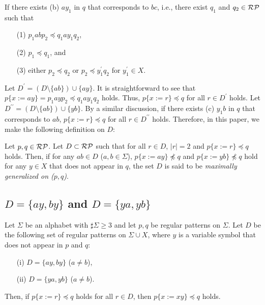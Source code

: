 \noindent
If there exists (b) $ay_{1}$ in $q$ that corresponds to $bc$, i.e., there exist $q_{1}$ and $q_{2}\in \mathcal{RP}$ such that
  \begin{enumerate}
  \item[(1)] $p_{1}abp_{2} \preceq q_{1}ay_{1}q_{2}$, 
  \item[(2)] $p_{1} \preceq q_{1}$, and
  \item[(3)] either $p_{2} \preceq q_{2}$ or $p_{2} \preceq y_{1}^{\prime}q_{2}$ for $y_{1}^{\prime}\in X$.
  \end{enumerate}
Let $D^{\prime} = (D \setminus \{ab\}) \cup \{ay\}$.
It is straightforward to see that $p\{x:=ay\} = p_{1}ayp_{2} \preceq q_{1}ay_{1}q_{2}$ holds.
Thus, $p \{ x := r \} \preceq q$ for all $r \in D^{\prime}$ holds.
Let $D^{\prime\prime} = (D \setminus \{ab\}) \cup \{yb\}$.
By a similar discussion, if there exists (c) $y_{1}b$ in $q$ that corresponds to $ab$, $p \{ x := r \} \preceq q$ for all $r \in D^{\prime\prime}$ holds.
Therefore, in this paper, we make the following definition on $D$:

\smallskip

\begin{dfn}
Let $p,q \in \mathcal{RP}$.
Let $D \subset \mathcal{RP}$ such that for all $r\in D$, $|r| = 2$ and $p \{ x := r \} \preceq q$ holds.
Then, if for any $ab\in D$ ($a,b\in\Sigma$), $p \{ x := ay \} \not\preceq q$ and $p \{ x := yb \} \not\preceq q$ hold for any $y \in X$ that does not appear in $q$, the set $D$ is said to be \textit{maximally generalized on ($p,q$)}.
\end{dfn}

\subsection{$D=\{ ay, by \}$ and $D=\{ ya, yb \}$}\label{subsec:d2}

\begin{lem}\label{lem:twovariables}
Let $\Sigma$ be an alphabet with $\sharp\Sigma \ge 3$ and let $p,q$ be regular patterns on $\Sigma$.
Let $D$ be the following set of regular patterns on $\Sigma\cup X$, where $y$ is a variable symbol that does not appear in $p$ and $q$:
\begin{enumerate}
\item[{\rm (i)}] $D=\{ ay, by \}$ ($a \not= b$),
\item[{\rm (ii)}] $D=\{ ya, yb \}$ ($a \not= b$).
\end{enumerate}
Then, if $p \{ x := r \} \preceq q$ holds for all $r \in D$, then $p \{ x := xy \} \preceq q$ holds.
\end{lem}

